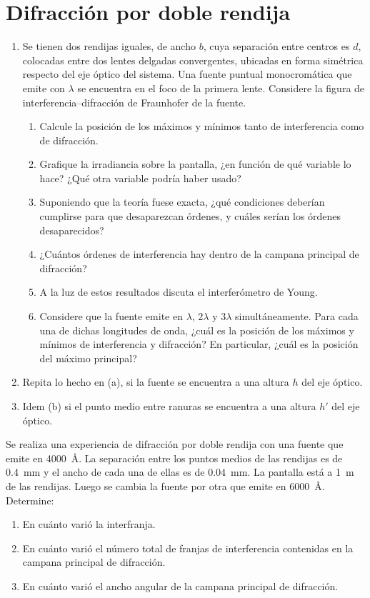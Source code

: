 \section*{Difracción por doble rendija}

\item 
\begin{enumerate}
	\item Se tienen dos rendijas iguales, de ancho $b$, cuya separación entre centros es $d$, colocadas entre dos lentes delgadas convergentes, ubicadas en forma simétrica respecto del eje óptico del sistema.
	Una fuente puntual monocromática que emite con $\lambda$ se encuentra en el foco de la primera lente. Considere la figura de interferencia--difracción de Fraunhofer de la fuente. 
	\begin{enumerate}
		\item Calcule la posición de los máximos y mínimos tanto de interferencia como de difracción. 
		\item Grafique la irradiancia sobre la pantalla, ¿en función de qué variable lo hace?
		¿Qué otra variable podría haber usado?
		\item Suponiendo que la teoría fuese exacta, ¿qué condiciones deberían cumplirse para que desaparezcan órdenes, y cuáles serían los órdenes desaparecidos? 
		\item ¿Cuántos órdenes de interferencia hay dentro de la campana principal de difracción?
		\item A la luz de estos resultados discuta el interferómetro de Young. 
		\item Considere que la fuente emite en $\lambda$, $2\lambda$ y $3\lambda$ simultáneamente.
		Para cada una de dichas longitudes de onda, ¿cuál es la posición de los máximos y mínimos de interferencia y difracción?
		En particular, ¿cuál es la posición del máximo principal?
	\end{enumerate}
	\item Repita lo hecho en (a), si la fuente se encuentra a una altura $h$ del eje óptico. 
	\item Idem (b) si el punto medio entre ranuras se encuentra a una altura $h'$ del eje óptico. 
\end{enumerate}


\item Se realiza una experiencia de difracción por doble rendija con una fuente que emite en \SI{4000}{\angstrom}.
La separación entre los puntos medios de las rendijas es de \SI{0.4}{\milli\metre} y el ancho de cada una de ellas es de \SI{0.04}{\milli\metre}.
La pantalla está a \SI{1}{\metre} de las rendijas.
Luego se cambia la fuente por otra que emite en \SI{6000}{\angstrom}.
Determine:
\begin{enumerate}
	\item En cuánto varió la interfranja. 
	\item En cuánto varió el número total de franjas de interferencia contenidas en la campana principal de difracción. 
	\item En cuánto varió el ancho angular de la campana principal de difracción. 
\end{enumerate}



